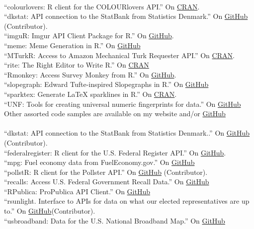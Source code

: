 \documentclass[12pt]{article}
\renewcommand{\section}[1]{\pagebreak[3]%
    \llap{\scshape\smash{\parbox[t]{\marginparwidth}{\raggedright {\color{lg}#1}}}}%
    \vspace{-\baselineskip}\par}
\newcommand{\topic}[1]{\pagebreak[3]\indent {\color{lg}{\footnotesize #1 }}\\}
\newcommand{\entry}[1]{\indent {\color{lg}\guillemotright}\hspace{2pt}#1\vspace{.25em}\\}
\begin{document}
\section{Software}
\topic{R packages}
\entry{``colourlovers: R client for the COLOURlovers API.'' On \href{http://cran.r-project.org/web/packages/colourlovers/index.html}{CRAN}.}
\entry{``dkstat: API connection to the StatBank from Statistics Denmark.'' On \href{https://github.com/krose/dkstat}{GitHub} (Contributor).}
\entry{``imguR: Imgur API Client Package for R.'' On \href{https://github.com/leeper/imguR}{GitHub}.}
\entry{``meme: Meme Generation in R.'' On \href{https://github.com/leeper/meme}{GitHub}}
\entry{``MTurkR: Access to Amazon Mechanical Turk Requester API.'' On \href{http://cran.r-project.org/web/packages/MTurkR/index.html}{CRAN}.}
\entry{``rite: The Right Editor to Write R.'' On \href{http://cran.r-project.org/web/packages/rite/index.html}{CRAN}}
\entry{``Rmonkey: Access Survey Monkey from R.'' On \href{https://github.com/leeper/Rmonkey}{GitHub}.}
\entry{``slopegraph: Edward Tufte-inspired Slopegraphs in R.'' On \href{https://github.com/leeper/slopegraph}{GitHub}}
\entry{``sparktex: Generate LaTeX sparklines in R.'' On \href{http://cran.r-project.org/web/packages/sparktex/index.html}{CRAN}.}
\entry{``UNF: Tools for creating universal numeric fingerprints for data.'' On \href{https://github.com/leeper/UNF}{GitHub}}
\entry{Other assorted code samples are available on my website and/or \href{http://github.com/leeper}{GitHub}}

\topic{R packages contributed to rOpenGov}
\entry{``dkstat: API connection to the StatBank from Statistics Denmark..'' On \href{https://github.com/rOpenGov/dkstat}{GitHub} (Contributor).}
\entry{``federalregister: R client for the U.S. Federal Register API.'' On \href{https://github.com/rOpenGov/federalregister}{GitHub}.}
\entry{``mpg: Fuel economy data from FuelEconomy.gov.'' On \href{https://github.com/rOpenGov/mpg}{GitHub}}
\entry{``pollstR: R client for the Pollster API.'' On \href{https://github.com/rOpenGov/pollstR}{GitHub} (Contributor).}
\entry{``recalls: Access U.S. Federal Government Recall Data.'' On \href{https://github.com/rOpenGov/recalls}{GitHub}}
\entry{``RPublica: ProPublica API Client.'' On \href{https://github.com/rOpenGov/RPublica}{GitHub}}
\entry{``rsunlight. Interface to APIs for data on what our elected representatives are up to.'' On \href{https://github.com/rOpenGov/rsunlight}{GitHub}(Contributor).}
\entry{``usbroadband: Data for the U.S. National Broadband Map.'' On \href{https://github.com/rOpenGov/usbroadband}{GitHub}}
\end{document}
